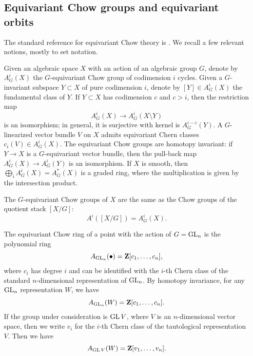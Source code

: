 \documentclass[11pt,reqno, letterpaper]{amsart}
\renewcommand{\to}{{\longrightarrow}}
\numberwithin{equation}{section}
\begin{document}
\subsection{Equivariant Chow groups and equivariant orbits}
The standard reference for equivariant Chow theory is \cite{edi.gra:98}.
We recall a few relevant notions, mostly to set notation.

Given an algebraic space $X$ with an action of an algebraic group $G$,
denote by $A^i_G(X)$ the $G$-equivariant Chow group of codimension $i$
cycles.  Given a $G$-invariant subspace $Y \subset X$ of pure
codimension $i$, denote by $[Y] \in A^i_G(X)$ the fundamental class of
$Y$.  If $Y \subset X$ has codimension $c$ and $c > i$, then the restriction map
\[ A^i_G(X) \to A^i_G(X \setminus Y)\]
is an isomorphism; in general, it is surjective with kernel is $A^{i-c}_G(Y)$.
A $G$-linearized vector bundle
$V$ on $X$ admits equivariant Chern classes $c_i(V) \in A^i_G(X)$.
The equivariant Chow groups are homotopy invariant: if $Y \to X$ is a
$G$-equivariant vector bundle, then the pull-back map
$A^i_G(X) \to A^i_G(Y)$ is an isomorphism.  If $X$ is smooth, then
$\bigoplus_i A^i_G(X) = A^*_G(X)$ is a graded ring, where the multiplication is given by the
intersection product.

The $G$-equivariant Chow groups of $X$ are the same as the Chow groups
of the quotient stack $[X/G]$:
\[ A^i\left( [X/G] \right) = A^i_G(X).\]

The equivariant Chow ring of a point with the action of $G = \operatorname{GL}_n$ is
the polynomial ring
\[ A_{\operatorname{GL}_n}(\bullet) = {\bf Z}[c_1,\dots, c_n],\] where $c_i$ has
degree $i$ and can be identified with the $i$-th Chern class of the
standard $n$-dimensional representation of $\operatorname{GL}_n$.  By homotopy
invariance, for any $\operatorname{GL}_n$ representation $W$, we have
\[ A_{\operatorname{GL}_n}(W) = {\bf Z}[c_1,\dots,c_n].\]
If the group under consideration is $\operatorname{GL} V$, where $V$ is an $n$-dimensional vector space,
then we write $v_i$ for the $i$-th Chern class of the tautological
representation $V$.  Then we have
\[ A_{\operatorname{GL} V}(W) = {\bf Z}[v_1,\dots,v_n].\]
\end{document}
